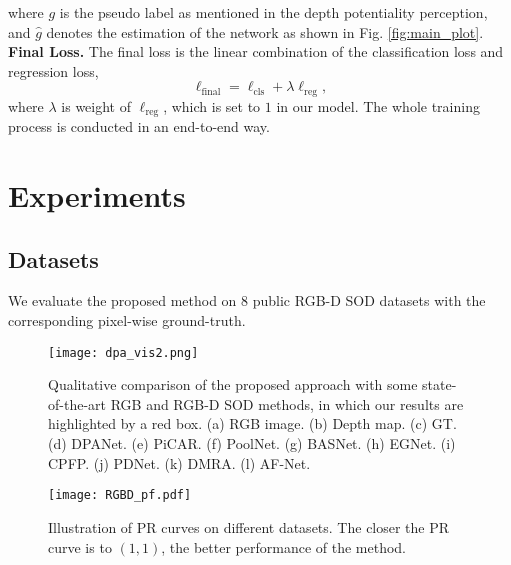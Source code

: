 \documentclass[journal]{IEEEtran}
\begin{document}
where $g$ is the pseudo label as mentioned in the depth potentiality perception, and $\hat{g}$ denotes the estimation of the network as shown in Fig. \ref{fig:main_plot}. \\
\indent\textbf{Final Loss.} The final loss is the linear combination of the classification loss and regression loss,
\begin{equation}
	\ell_{\mathrm{final}} = \ell_{\mathrm{cls}} + \lambda \ell_{\mathrm{reg}},
\end{equation}
where $\lambda$ is weight of $\ell_{\mathrm{reg}}$, which is set to $1$ in our model.
The whole training process is conducted in an end-to-end way.




\section{Experiments}
\subsection{Datasets}
We evaluate the proposed method on $8$ public RGB-D SOD datasets with the corresponding pixel-wise ground-truth.


\begin{figure*}[!t]
	\centering
	\texttt{[image: dpa\_vis2.png]}
	\caption{Qualitative comparison of the proposed approach with some state-of-the-art RGB and RGB-D SOD methods, in which our results are highlighted by a red box. (a) RGB image. (b) Depth map. (c) GT. (d) DPANet. (e) PiCAR. (f) PoolNet. (g) BASNet. (h) EGNet. (i) CPFP. (j) PDNet. (k) DMRA. (l) AF-Net.}
	\label{fig:vis}
\end{figure*}

\begin{figure*}[t]
	\centering
	\texttt{[image: RGBD\_pf.pdf]}
	\caption{Illustration of PR curves on different datasets. The closer the PR curve is to $(1,1)$, the better performance of the method.}
	\label{fig:pr}
\end{figure*}
\end{document}
